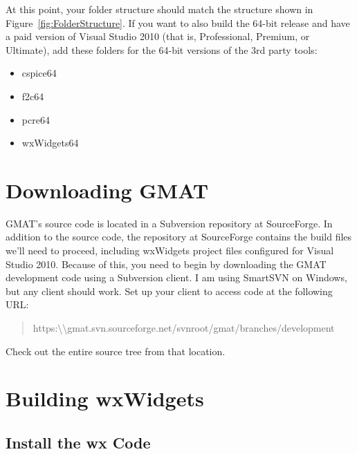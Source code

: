 \documentclass[letterpaper,10pt]{article}%
\begin{document}
\noindent At this point, your folder structure should match the structure shown in Figure~\ref{fig:FolderStructure}.  If you want to also build the 64-bit release and have a paid version of Visual Studio 2010 (that is, Professional, Premium, or Ultimate), add these folders for the 64-bit versions of the 3rd party tools:
\begin{itemize}
\item cspice64
\item f2c64
\item pcre64
\item wxWidgets64
\end{itemize}


\section{Downloading GMAT}

GMAT's source code is located in a Subversion repository at SourceForge.  In addition to the source code, the repository at SourceForge contains the build files we'll need to proceed, including wxWidgets project files configured for Visual Studio 2010.  Because of this, you need to begin by downloading the GMAT development code using a Subversion client.  I am using SmartSVN on Windows, but any client should work.  Set up your client to access code at the following URL:

\begin{quote}
https:\textbackslash\textbackslash gmat.svn.sourceforge.net/svnroot/gmat/branches/development
\end{quote}
\noindent Check out the entire source tree from that location.

\section{Building wxWidgets}

\subsection{Install the wx Code}
\end{document}
